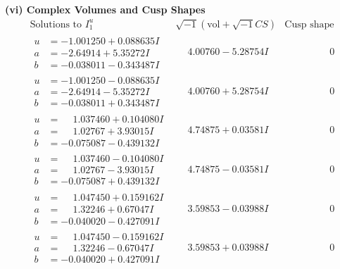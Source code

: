 \documentclass[1p]{elsarticle_modified}
\theoremstyle{definition}
\newcommand{\I}{\sqrt{-1}}
\begin{document}
\newpage\flushleft \textbf{(vi) Complex Volumes and Cusp Shapes}
$$\begin{array}{c|c|c}  
\text{Solutions to }I^u_{1}& \I (\text{vol} + \sqrt{-1}CS) & \text{Cusp shape}\\
 \hline 
\begin{aligned}
u &= -1.001250 + 0.088635 I \\
a &= -2.64914 + 5.35272 I \\
b &= -0.038011 - 0.343487 I\end{aligned}
 & \phantom{-}4.00760 - 5.28754 I & \phantom{-0.000000 } 0 \\ \hline\begin{aligned}
u &= -1.001250 - 0.088635 I \\
a &= -2.64914 - 5.35272 I \\
b &= -0.038011 + 0.343487 I\end{aligned}
 & \phantom{-}4.00760 + 5.28754 I & \phantom{-0.000000 } 0 \\ \hline\begin{aligned}
u &= \phantom{-}1.037460 + 0.104080 I \\
a &= \phantom{-}1.02767 + 3.93015 I \\
b &= -0.075087 - 0.439132 I\end{aligned}
 & \phantom{-}4.74875 + 0.03581 I & \phantom{-0.000000 } 0 \\ \hline\begin{aligned}
u &= \phantom{-}1.037460 - 0.104080 I \\
a &= \phantom{-}1.02767 - 3.93015 I \\
b &= -0.075087 + 0.439132 I\end{aligned}
 & \phantom{-}4.74875 - 0.03581 I & \phantom{-0.000000 } 0 \\ \hline\begin{aligned}
u &= \phantom{-}1.047450 + 0.159162 I \\
a &= \phantom{-}1.32246 + 0.67047 I \\
b &= -0.040020 - 0.427091 I\end{aligned}
 & \phantom{-}3.59853 - 0.03988 I & \phantom{-0.000000 } 0 \\ \hline\begin{aligned}
u &= \phantom{-}1.047450 - 0.159162 I \\
a &= \phantom{-}1.32246 - 0.67047 I \\
b &= -0.040020 + 0.427091 I\end{aligned}
 & \phantom{-}3.59853 + 0.03988 I & \phantom{-0.000000 } 0 \\ \hline\begin{aligned}

\end{aligned}
\end{array}$$
\end{document}
